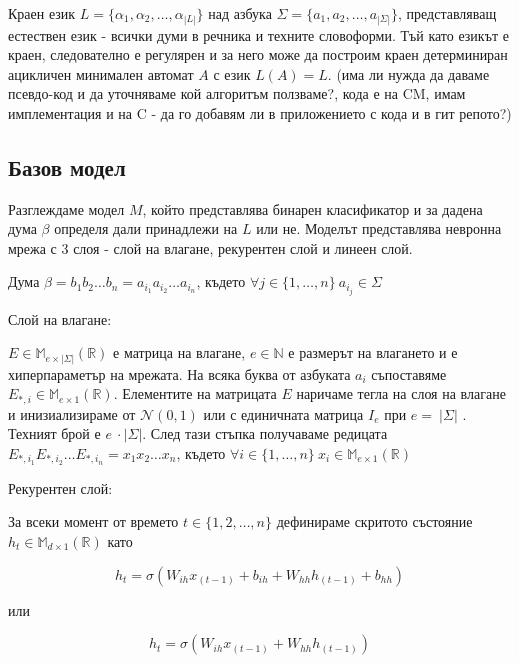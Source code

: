 \documentclass[a4paper,12pt]{article}
\begin{document}
Краен език $L = \{\alpha_1, \alpha_2, \ldots, \alpha_{|L|}\}$ над азбука $\Sigma = \{a_1, a_2, \ldots, a_{|\Sigma|}\}$, представляващ естествен език - всички думи в речника и техните словоформи. Тъй като езикът е краен, следователно е регулярен и за него може да построим краен детерминиран ацикличен минимален автомат $A$ с език $L(A) = L$. (има ли нужда да даваме псевдо-код и да уточняваме кой алгоритъм ползваме?, кода е на CM, имам имплементация и на C - да го добавям ли в приложението с кода и в гит репото?)

\subsection{Базов модел}

Разглеждаме модел $M$, който представлява бинарен класификатор и за дадена дума $\beta$ определя дали принадлежи на $L$ или не. Моделът представлява невронна мрежа с 3 слоя - слой на влагане, рекурентен слой и  линеен слой.

Дума $\beta = b_1 b_2 \ldots b_n = a_{i_1} a_{i_2} \ldots a_{i_n}$, където $\forall j \in \{1, \ldots, n\} \: a_{i_j} \in \Sigma$

Слой на влагане:

$E \in \mathbb{M}_{e \times |\Sigma|} (\mathbb{R})$ е матрица на влагане, $e \in \mathbb{N}$ е размерът на влагането и е хиперпараметър на мрежата. 
На всяка буква от азбуката $a_i$ съпоставяме $E_{*, i} \in \mathbb{M}_{e \times 1} (\mathbb{R})$. Елементите на матрицата $E$ наричаме тегла на слоя на влагане и инизиализираме от $\mathcal{N}(0, 1)$ или с единичната матрица $I_e$ при $e =\:|\Sigma|$ . Техният брой е $e\:\cdot |\Sigma|$. След тази стъпка получаваме редицата $E_{*, i_1}E_{*, i_2} \ldots E_{*, i_n} = x_1 x_2 \ldots x_n$, където $\forall i \in \{1, \ldots, n\} \: x_i \in \mathbb{M}_{e \times 1} (\mathbb{R})$

Рекурентен слой:

За всеки момент от времето $t \in \{1, 2, \ldots, n\}$ дефинираме скритото състояние $h_t \in \mathbb{M}_{d \times 1} (\mathbb{R})$ като

\begin{equation} \label{eq:1}
h_t = \sigma(W_{ih} x_{(t-1)} + b_{ih} + W_{hh} h_{(t-1)} + b_{hh})
\end{equation}

или 

\begin{equation} \label{eq:2}
h_t = \sigma(W_{ih} x_{(t-1)} + W_{hh} h_{(t-1)})
\end{equation}
\end{document}
